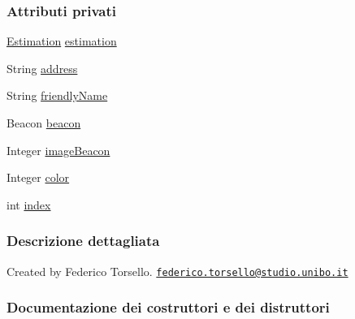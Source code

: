 \subsubsection*{Attributi privati}
\begin{DoxyCompactItemize}
\item 
\hyperlink{classit_1_1unibo_1_1torsello_1_1bluetoothpositioning_1_1distanceEstimation_1_1Estimation}{Estimation} \hyperlink{classit_1_1unibo_1_1torsello_1_1bluetoothpositioning_1_1model_1_1Device_ac619c42728cd40f41a5f12fde56b4425_ac619c42728cd40f41a5f12fde56b4425}{estimation}
\item 
String \hyperlink{classit_1_1unibo_1_1torsello_1_1bluetoothpositioning_1_1model_1_1Device_a0abcf7e0df4ccc96e487c6f9b90b4e13_a0abcf7e0df4ccc96e487c6f9b90b4e13}{address}
\item 
String \hyperlink{classit_1_1unibo_1_1torsello_1_1bluetoothpositioning_1_1model_1_1Device_aa9a540b316c9de7f9b3a94f58570f6d3_aa9a540b316c9de7f9b3a94f58570f6d3}{friendly\+Name}
\item 
Beacon \hyperlink{classit_1_1unibo_1_1torsello_1_1bluetoothpositioning_1_1model_1_1Device_ad5ffce680eb2eb38fc6bb8aee234f155_ad5ffce680eb2eb38fc6bb8aee234f155}{beacon}
\item 
Integer \hyperlink{classit_1_1unibo_1_1torsello_1_1bluetoothpositioning_1_1model_1_1Device_a54d308c064bbad3b1680895680697dd7_a54d308c064bbad3b1680895680697dd7}{image\+Beacon}
\item 
Integer \hyperlink{classit_1_1unibo_1_1torsello_1_1bluetoothpositioning_1_1model_1_1Device_a903c767011327aa70b1e6c9ecf3b72eb_a903c767011327aa70b1e6c9ecf3b72eb}{color}
\item 
int \hyperlink{classit_1_1unibo_1_1torsello_1_1bluetoothpositioning_1_1model_1_1Device_a55a01164b2388451f5e8344bfbc61ccc_a55a01164b2388451f5e8344bfbc61ccc}{index}
\end{DoxyCompactItemize}


\subsubsection{Descrizione dettagliata}
Created by Federico Torsello. \href{mailto:federico.torsello@studio.unibo.it}{\tt federico.\+torsello@studio.\+unibo.\+it} 

\subsubsection{Documentazione dei costruttori e dei distruttori}
\hypertarget{classit_1_1unibo_1_1torsello_1_1bluetoothpositioning_1_1model_1_1Device_a2617f025dd33e0cae4adb3323245f865_a2617f025dd33e0cae4adb3323245f865}{}\label{classit_1_1unibo_1_1torsello_1_1bluetoothpositioning_1_1model_1_1Device_a2617f025dd33e0cae4adb3323245f865_a2617f025dd33e0cae4adb3323245f865} 
